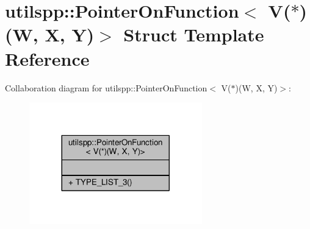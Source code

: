 \hypertarget{structutilspp_1_1PointerOnFunction_3_01V_07_5_08_07W_00_01X_00_01Y_08_4}{\section{utilspp\-:\-:Pointer\-On\-Function$<$ V($\ast$)(W, X, Y)$>$ Struct Template Reference}
\label{structutilspp_1_1PointerOnFunction_3_01V_07_5_08_07W_00_01X_00_01Y_08_4}
}


Collaboration diagram for utilspp\-:\-:Pointer\-On\-Function$<$ V($\ast$)(W, X, Y)$>$\-:\nopagebreak
\begin{figure}[H]
\begin{center}
\leavevmode
\includegraphics[width=212pt]{structutilspp_1_1PointerOnFunction_3_01V_07_5_08_07W_00_01X_00_01Y_08_4__coll__graph}
\end{center}
\end{figure}
